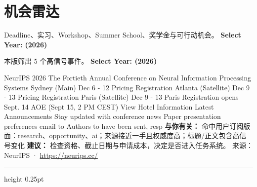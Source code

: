 \documentclass[10.5pt]{ctexart}
\begin{document}
\section*{机会雷达}
{\color{ormuted} Deadline、实习、Workshop、Summer School、奖学金与可行动机会。}
\vspace{2mm}
{\LARGE\bfseries Select Year: (2026)}\par
\vspace{1mm}
{\color{ormuted} 本版筛出 5 个高信号事件。}
\vspace{3mm}
{\Large\bfseries Select Year: (2026)}\par
NeurIPS 2026 The Fortieth Annual Conference on Neural Information Processing Systems Sydney (Main) Dec 6 - 12 Pricing Registration Atlanta (Satellite) Dec 9 - 13 Pricing Registration Paris (Satellite) Dec 9 - 13 Paris Registration opens Sept. 14 AOE (Sept 15, 2 PM CEST) View Hotel Information Latest Announcements Stay updated with conference news Paper presentation preferences email to Authors to have been sent, resp
\textbf{与你有关：} 命中用户订阅版面：research、opportunity、ai；来源接近一手且权威度高；标题/正文包含高信号变化
\textbf{建议：} 检查资格、截止日期与申请成本，决定是否进入任务系统。
{\footnotesize\color{ormuted} 来源：NeurIPS · \url{https://neurips.cc/}}
\vspace{4mm}
\hrule height 0.25pt
\vspace{3mm}
\end{document}
